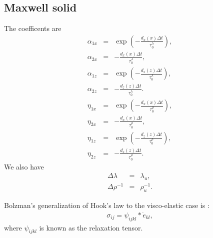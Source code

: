 \documentclass[11pt]{article}
\begin{document}
\subsection*{Maxwell solid}
The coefficents are
\begin{eqnarray}
  \alpha_{1x} & = & \exp\left(-\frac{d_x(x)\Delta t}
                          {\tau^{\lambda}_0}\right),              \\
  \alpha_{2x} & = & -\frac{d_x(x)\Delta t}
                  {\tau^{\lambda}_0},                             \\
  \alpha_{1z} & = & \exp\left(-\frac{d_z(z)\Delta t}
                  {\tau^{\lambda}_0}\right),                      \\
  \alpha_{2z}  & = & -\frac{d_z(z)\Delta t}
                  {\tau^{\lambda}_0}.                             \\
  \eta_{1x} & = & \exp\left(-\frac{d_x(x)\Delta t}
                          {\tau^{\rho}_0}\right),                 \\
  \eta_{2x} & = & -\frac{d_x(x)\Delta t}
                  {\tau^{\rho}_0},                                \\
  \eta_{1z} & = & \exp\left(-\frac{d_z(z)\Delta t}
                  {\tau^{\rho}_0}\right),                         \\
  \eta_{2z}  & = & -\frac{d_z(z)\Delta t}
                  {\tau^{\rho}_0}.                                
\end{eqnarray}
We also have
\begin{eqnarray}
  \Delta \lambda 
    & = & \lambda_u,                  \\
  \Delta \rho^{-1} 
    & = & \rho^{-1}_u.
\end{eqnarray}

Bolzman's generalization of Hook's law to the visco-elastic case is
\citep{Hudson1985}:
\begin{eqnarray}
\sigma_{ij} = \psi_{ijkl}*\dot{e}_{kl},
                  \label{eq:boltzman}
\end{eqnarray}where $\psi_{ijkl}$ is known as the relaxation tensor.
\end{document}
